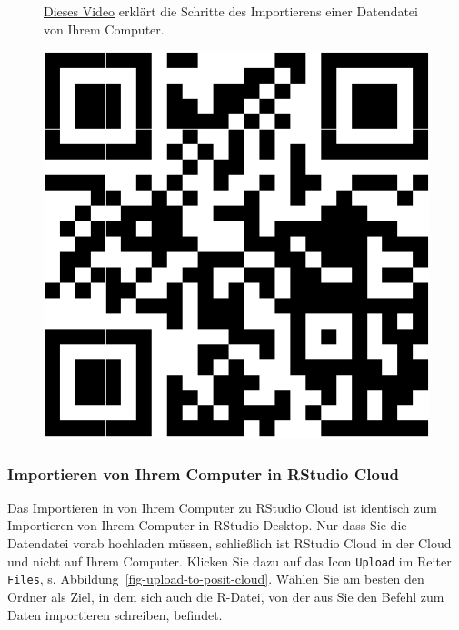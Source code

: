 \documentclass[
  letterpaper,
]{scrbook}
\theoremstyle{definition}
\theoremstyle{definition}
\theoremstyle{definition}
\theoremstyle{remark}
\begin{document}
\begin{figure}

\begin{minipage}{0.80\linewidth}
\href{https://youtu.be/B_nuN-M0pQM}{Dieses Video} erklärt die Schritte
des Importierens einer Datendatei von Ihrem Computer.\end{minipage}%
%
\begin{minipage}{0.20\linewidth}

\begin{center}
\includegraphics[width=0.75\linewidth,height=\textheight,keepaspectratio]{020-R_files/figure-pdf/unnamed-chunk-31-1.pdf}
\end{center}

\end{minipage}%

\end{figure}%

\subsubsection{Importieren von Ihrem Computer in RStudio
Cloud}\label{importieren-von-ihrem-computer-in-rstudio-cloud}

Das Importieren in von Ihrem Computer zu RStudio Cloud ist identisch zum
Importieren von Ihrem Computer in RStudio Desktop. Nur dass Sie die
Datendatei vorab hochladen müssen, schließlich ist RStudio Cloud in der
Cloud und nicht auf Ihrem Computer. Klicken Sie dazu auf das Icon
\texttt{Upload} im Reiter \texttt{Files}, s.
Abbildung~\ref{fig-upload-to-posit-cloud}. Wählen Sie am besten den
Ordner als Ziel, in dem sich auch die R-Datei, von der aus Sie den
Befehl zum Daten importieren schreiben, befindet.
\end{document}
